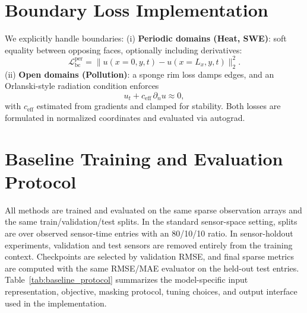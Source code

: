 \section{Boundary Loss Implementation}
\label{sec:boundary_loss}
We explicitly handle boundaries:  
(i) \textbf{Periodic domains (Heat, SWE)}: soft equality between opposing faces, optionally including derivatives:
\[
\mathcal{L}_{\text{bc}}^{\text{per}} = \| u(x=0,y,t) - u(x=L_x,y,t) \|_2^2.
\]  
(ii) \textbf{Open domains (Pollution)}: a sponge rim loss damps edges, and an Orlanski-style radiation condition enforces
\[
u_t + c_{\text{eff}} \,\partial_n u \approx 0,
\]
with $c_{\text{eff}}$ estimated from gradients and clamped for stability. Both losses are formulated in normalized coordinates and evaluated via autograd.

\section{Baseline Training and Evaluation Protocol}
\label{sec:baseline_protocol}

All methods are trained and evaluated on the same sparse observation arrays and the same train/validation/test splits. In the standard sensor-space setting, splits are over observed sensor-time entries with an 80/10/10 ratio. In sensor-holdout experiments, validation and test sensors are removed entirely from the training context. Checkpoints are selected by validation RMSE, and final sparse metrics are computed with the same RMSE/MAE evaluator on the held-out test entries. Table~\ref{tab:baseline_protocol} summarizes the model-specific input representation, objective, masking protocol, tuning choices, and output interface used in the implementation.

